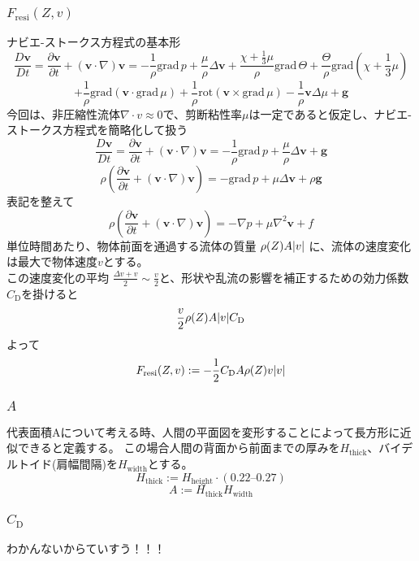 \documentclass[a4paper,12pt]{article}
\begin{document}
\subsubsection{$F_{\mathrm{resi}}(Z, v)$}
ナビエ-ストークス方程式の基本形
\[
\frac{D\boldsymbol{v}}{Dt} = \frac{\partial \boldsymbol{v}}{\partial t} + \left(\boldsymbol{v} \cdot \nabla\right)\boldsymbol{v} = -\frac{1}{\rho}\mathrm{grad}\,p + \frac{\mu}{\rho}\Delta\boldsymbol{v} + \frac{\chi + \frac{1}{3}\mu}{\rho}\mathrm{grad}\,\Theta + \frac{\Theta}{\rho}\mathrm{grad}\left(\chi + \frac{1}{3}\mu\right)
\]
\[
+ \frac{1}{\rho}\mathrm{grad}\left(\boldsymbol{v} \cdot \mathrm{grad}\,\mu\right) + \frac{1}{\rho}\mathrm{rot}\left(\boldsymbol{v} \times \mathrm{grad}\,\mu\right) - \frac{1}{\rho}\boldsymbol{v}\Delta\mu + \boldsymbol{g}
\]
今回は、非圧縮性流体$\nabla\cdot v \approx 0$で、剪断粘性率$\mu$は一定であると仮定し、ナビエ-ストークス方程式を簡略化して扱う
\[
  \frac{D\boldsymbol{v}}{Dt} = \frac{\partial \boldsymbol{v}}{\partial t} + \left(\boldsymbol{v} \cdot \nabla\right)\boldsymbol{v} = -\frac{1}{\rho}\mathrm{grad}\,p + \frac{\mu}{\rho}\Delta\boldsymbol{v} + \boldsymbol{g}
\]
\[
  \rho\left(\frac{\partial \boldsymbol{v}}{\partial t} + \left(\boldsymbol{v} \cdot \nabla\right)\boldsymbol{v}\right) = -\mathrm{grad}\,p + \mu\Delta\boldsymbol{v} + \rho\boldsymbol{g}
\]
表記を整えて
\[
  \rho\left(\frac{\partial \boldsymbol{v}}{\partial t} + \left(\boldsymbol{v} \cdot \nabla\right)\boldsymbol{v}\right)= -\nabla p + \mu \nabla^2\boldsymbol{v} + f
\]
単位時間あたり、物体前面を通過する流体の質量 $\rho(Z)A\abs{v}$ に、流体の速度変化は最大で物体速度$v$とする。\\
この速度変化の平均 $\frac{\Delta v + v}{2} \sim \frac{v}{2}$と、形状や乱流の影響を補正するための効力係数$C_\mathrm{D}$を掛けると
\[
  \frac{v}{2}\rho(Z)A\abs{v}C_\mathrm{D}
\]
よって
\[
  F_{\mathrm{resi}}(Z, v) := -\frac{1}{2}C_{\mathrm{D}}A\rho(Z)v\abs{v}
\]

\subsubsection{$A$}
代表面積Aについて考える時、人間の平面図を変形することによって長方形に近似できると定義する。
この場合人間の背面から前面までの厚みを$H_{\mathrm{thick}}$、バイデルトイド(肩幅間隔)を$H_{\mathrm{width}}$とする。
\[
H_{\mathrm{thick}} := H_{\mathrm{height}} \cdot (0.22 \text{--} 0.27)
\]
\[
A := H_{\mathrm{thick}} H_{\mathrm{width}}
\]

\subsubsection{$C_{\mathrm{D}}$}
わかんないからていすう！！！ %
\end{document}
